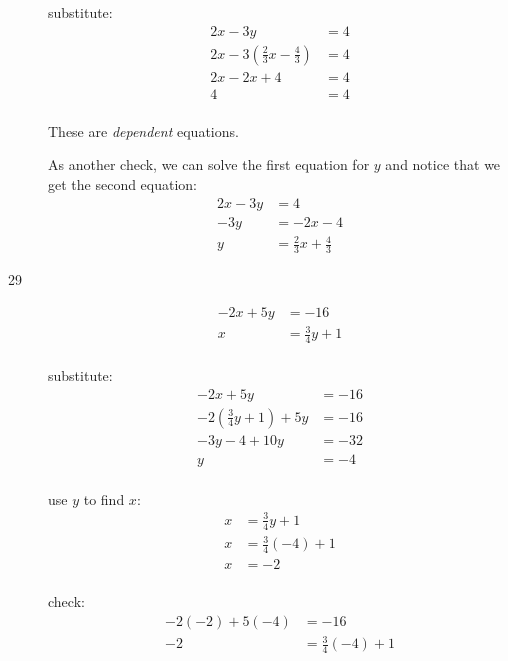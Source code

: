 \documentclass[fleqn,addpoints]{exam}
\begin{document}
\begin{description}
substitute:
\begin{align*}  
  2x-3y &= 4 \\
  2x - 3\left( \frac{2}{3} x - \frac{4}{3} \right) &= 4 \\
  2x - 2x + 4 &= 4 \\
  4 &= 4 \\
\end{align*}

These are {\em dependent} equations.

As another check, we can solve the first equation for $y$ and notice that we get the second equation:
\begin{align*}
  2x-3y &= 4 \\
  -3y &= -2x - 4 \\
  y &= \frac{2}{3} x + \frac{4}{3}
\end{align*}

\item[29]
\begin{align*}
  -2x + 5y &= -16 \\
  x &= \frac{3}{4} y + 1 \\
\end{align*}

substitute:
\begin{align*}
  -2x + 5y &= -16 \\
  -2\left( \frac{3}{4} y + 1 \right) + 5y &= -16 \\
  -3y - 4 + 10y &= -32 \\
  y &= -4 \\
\end{align*}

use $y$ to find $x$:
\begin{align*}
  x &= \frac{3}{4} y + 1 \\
  x &= \frac{3}{4} (-4) + 1 \\
  x &= -2 \\
\end{align*}

\vspace{0.2 cm}
\vspace{0.2 cm}

check:
\begin{align*}
  -2(-2) + 5(-4) &= -16 \\
  -2 &= \frac{3}{4} (-4) + 1 \\
\end{align*}


\end{description}
\end{document}
